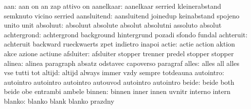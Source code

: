                       aan: aan                       on
                           an                        zap
                           attivo                    on
                aanelkaar: aanelkaar                 serried
                           kleinerabstand            semknuto
                           vicino                    serried
              aansluitend: aansluitend               joinedup
                           keinabstand               spojeno
                           unito                     unit
                 absoluut: absoluut                  absolute
                           absolut                   absolutni
                           assoluto                  absolut
              achtergrond: achtergrond               background
                           hintergrund               pozadi
                           sfondo                    fundal
                achteruit: achteruit                 backward
                           rueckwaerts               zpet
                           indietro                  inapoi
                    actie: actie                     action
                           aktion                    akce
                           azione                    actiune
                afsluiter: afsluiter                 stopper
                           trenner                   predel
                           stopper                   stopper
                   alinea: alinea                    paragraph
                           absatz                    odstavec
                           capoverso                 paragraf
                    alles: alles                     all
                           alles                     vse
                           tutti                     tot
                   altijd: altijd                    always
                           immer                     vzdy
                           sempre                    totdeauna
                autointro: autointro                 autointro
                           autointro                 autouvod
                           autointro                 autointro
                    beide: beide                     both
                           beide                     obe
                           entrambi                  ambele
                   binnen: binnen                    inner
                           innen                     uvnitr
                           interno                   intern
                   blanko: blanko                    blank
                           blanko                    prazdny
